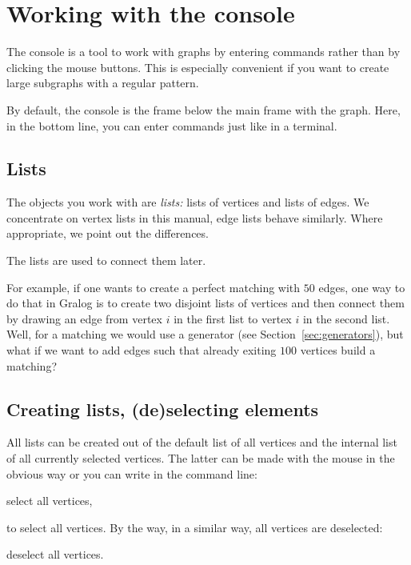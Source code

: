 \section{Working with the console}

The console is a tool to work with graphs by entering commands rather
than by clicking the mouse buttons. This is especially convenient if
you want to create large subgraphs with a regular pattern.

By default, the console is the frame below the main frame with the
graph. Here, in the bottom line, you can enter commands just like in a
terminal.

\subsection{Lists}

The objects you work with are \emph{lists:} lists of vertices and
lists of edges. We concentrate on vertex lists in this manual, edge
lists behave similarly. Where appropriate, we point out the
differences.

The lists are used to connect them later.


\begin{example}
  For example, if one wants to create a perfect matching with $50$
  edges, one way to do that in Gralog is to create two disjoint lists
  of vertices and then connect them by drawing an edge from vertex $i$
  in the first list to vertex $i$ in the second list. Well, for a
  matching we would use a generator (see
  Section~\ref{sec:generators}), but what if we want to add edges such
  that already exiting $100$ vertices build a matching?
  \label{ex:running}
\end{example}


\subsection{Creating lists, (de)selecting elements}

All lists can be created out of the default list of all
vertices and the internal list of all currently selected vertices. The
latter can be made with the mouse in the obvious way or you can write
in the command line:
\begin{tcolorbox}
  select all vertices,
\end{tcolorbox}
\noindent
to select all vertices. By the way, in a similar way, all vertices are
deselected:
\begin{tcolorbox}
deselect all vertices.
\end{tcolorbox}

